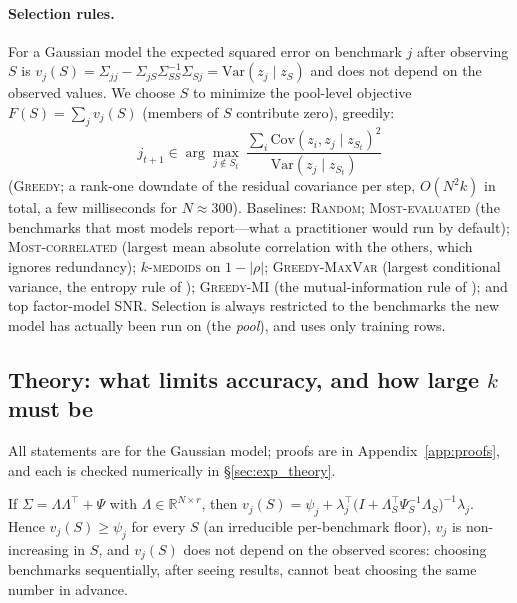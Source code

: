 \paragraph{Selection rules.}
For a Gaussian model the expected squared error on benchmark $j$ after observing $S$ is $v_j(S)=\Sigma_{jj}-\Sigma_{jS}\Sigma_{SS}^{-1}\Sigma_{Sj}=\mathrm{Var}(z_j\mid z_S)$ and does not depend on the observed values.
We choose $S$ to minimize the pool-level objective $F(S)=\sum_{j}v_j(S)$ (members of $S$ contribute zero), greedily:
\begin{equation}
 j_{t+1}\in\arg\max_{j\notin S_t}\ \frac{\sum_{i}\mathrm{Cov}(z_i,z_j\mid z_{S_t})^2}{\mathrm{Var}(z_j\mid z_{S_t})}
 \label{eq:greedy}
\end{equation}
(\textsc{Greedy}; a rank-one downdate of the residual covariance per step, $O(N^2k)$ in total, a few milliseconds for $N\approx 300$).
Baselines: \textsc{Random}; \textsc{Most-evaluated} (the benchmarks that most models report---what a practitioner would run by default); \textsc{Most-correlated} (largest mean absolute correlation with the others, which ignores redundancy); \textsc{$k$-medoids} on $1-|\rho|$; \textsc{Greedy-MaxVar} (largest conditional variance, the entropy rule of \citet{krause2008near}); \textsc{Greedy-MI} (the mutual-information rule of \citet{krause2008near}); and top factor-model SNR. Selection is always restricted to the benchmarks the new model has actually been run on (the \emph{pool}), and uses only training rows.

\subsection{Theory: what limits accuracy, and how large $k$ must be}
\label{sec:theory}
All statements are for the Gaussian model; proofs are in Appendix~\ref{app:proofs}, and each is checked numerically in \S\ref{sec:exp_theory}.

\begin{proposition}\label{prop:closed}
If $\Sigma=\Lambda\Lambda^\top+\Psi$ with $\Lambda\in\mathbb{R}^{N\times r}$, then
$v_j(S)=\psi_j+\lambda_j^\top\big(I+\Lambda_S^\top\Psi_S^{-1}\Lambda_S\big)^{-1}\lambda_j .$
Hence $v_j(S)\ge\psi_j$ for every $S$ (an irreducible per-benchmark floor), $v_j$ is non-increasing in $S$, and $v_j(S)$ does not depend on the observed scores: choosing benchmarks sequentially, after seeing results, cannot beat choosing the same number in advance.
\end{proposition}

